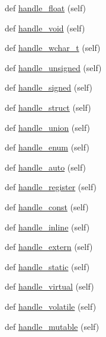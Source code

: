 \begin{DoxyCompactItemize}
\item 
def \hyperlink{classcpp_1_1ast_1_1_ast_builder_aabe3f6d67124181a8cd2665a4562d4f6}{handle\+\_\+float} (self)
\item 
def \hyperlink{classcpp_1_1ast_1_1_ast_builder_a7a8f94909d4080bad2bc5dabd934057b}{handle\+\_\+void} (self)
\item 
def \hyperlink{classcpp_1_1ast_1_1_ast_builder_a4ec65909aea14f45709733d631aed57b}{handle\+\_\+wchar\+\_\+t} (self)
\item 
def \hyperlink{classcpp_1_1ast_1_1_ast_builder_a793123ea878db159de1662c10bdae897}{handle\+\_\+unsigned} (self)
\item 
def \hyperlink{classcpp_1_1ast_1_1_ast_builder_a61c1e82b2b4fdc337cf360e485851390}{handle\+\_\+signed} (self)
\item 
def \hyperlink{classcpp_1_1ast_1_1_ast_builder_aadfad5b8d50962c04504e806dc0f5b6c}{handle\+\_\+struct} (self)
\item 
def \hyperlink{classcpp_1_1ast_1_1_ast_builder_a9b3fbfb21c6e23f04fd596d590f93eee}{handle\+\_\+union} (self)
\item 
def \hyperlink{classcpp_1_1ast_1_1_ast_builder_a341a6ffabadd444a345c8c98a611774c}{handle\+\_\+enum} (self)
\item 
def \hyperlink{classcpp_1_1ast_1_1_ast_builder_a0cb490894f17a6c34fbe6bb8f7a2e626}{handle\+\_\+auto} (self)
\item 
def \hyperlink{classcpp_1_1ast_1_1_ast_builder_a890e7764fc5fd8ad2da3a62e436278a0}{handle\+\_\+register} (self)
\item 
def \hyperlink{classcpp_1_1ast_1_1_ast_builder_a9d24135000a6fb4a3daabb5ab8883648}{handle\+\_\+const} (self)
\item 
def \hyperlink{classcpp_1_1ast_1_1_ast_builder_ab2eb0c18c07584ef246a46865a17ec40}{handle\+\_\+inline} (self)
\item 
def \hyperlink{classcpp_1_1ast_1_1_ast_builder_a49039750d971240a270606f0608c1ff0}{handle\+\_\+extern} (self)
\item 
def \hyperlink{classcpp_1_1ast_1_1_ast_builder_ad98bc262537d2882adc2017023cef6aa}{handle\+\_\+static} (self)
\item 
def \hyperlink{classcpp_1_1ast_1_1_ast_builder_a44710dc0b8e5bdbecaa56f7c4b59c046}{handle\+\_\+virtual} (self)
\item 
def \hyperlink{classcpp_1_1ast_1_1_ast_builder_a2dfb23ddeb05e1017b3d1ce85a40cacb}{handle\+\_\+volatile} (self)
\item 
def \hyperlink{classcpp_1_1ast_1_1_ast_builder_a6a642353cfe2cddd1a60cbb1011df787}{handle\+\_\+mutable} (self)

\end{DoxyCompactItemize}
